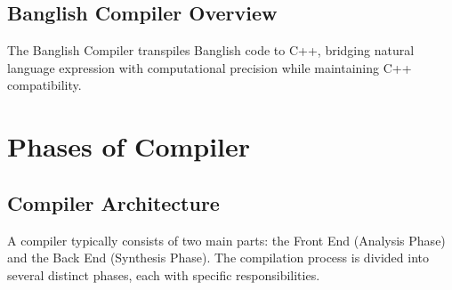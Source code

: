 \documentclass[12pt,a4paper]{article}
\begin{document}
\subsection{Banglish Compiler Overview}

The Banglish Compiler transpiles Banglish code to C++, bridging natural language expression with computational precision while maintaining C++ compatibility.

\section{Phases of Compiler}

\subsection{Compiler Architecture}

A compiler typically consists of two main parts: the Front End (Analysis Phase) and the Back End (Synthesis Phase). The compilation process is divided into several distinct phases, each with specific responsibilities.
\end{document}

